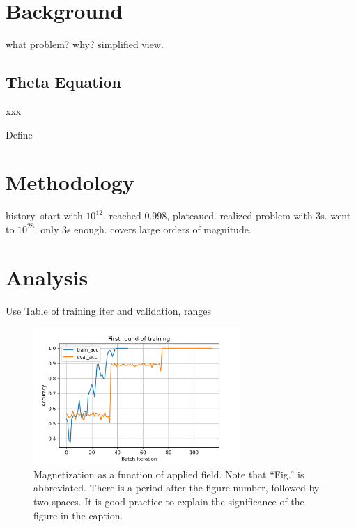 \documentclass[journal]{IEEEtai}
\begin{document}
\section{Background}

what problem? why? simplified view.

\subsection{Theta Equation}
xxx

Define 


\section{Methodology}

history. start with $10^{12}$. reached 0.998, plateaued. realized problem with 3s. went to $10^{28}$. only 3s enough. covers large orders of magnitude.


\section{Analysis}

Use 
Table of training iter and validation, ranges

\begin{figure}
\centerline{\includegraphics[width=18.5pc]{Figure1.png}}
\caption{Magnetization as a function of applied field. Note that ``Fig.'' is abbreviated. There is a period after the figure number, followed by two spaces. It is good practice to explain the significance of the figure in the caption.}
\end{figure}
\end{document}
